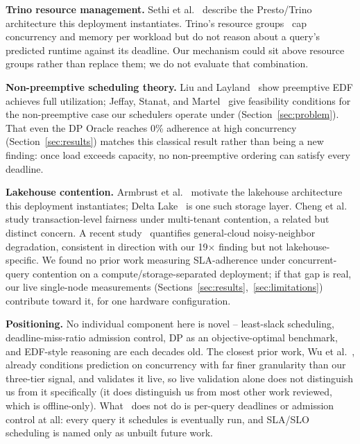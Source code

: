 \documentclass[conference]{IEEEtran}
\begin{document}
\textbf{Trino resource management.} Sethi et al.~\cite{sethi2019presto} describe the Presto/Trino architecture this deployment instantiates. Trino's resource groups~\cite{trino2026resourcegroups} cap concurrency and memory per workload but do not reason about a query's predicted runtime against its deadline. Our mechanism could sit above resource groups rather than replace them; we do not evaluate that combination.

\textbf{Non-preemptive scheduling theory.} Liu and Layland~\cite{liu1973scheduling} show preemptive EDF achieves full utilization; Jeffay, Stanat, and Martel~\cite{jeffay1991nonpreemptive} give feasibility conditions for the non-preemptive case our schedulers operate under (Section~\ref{sec:problem}). That even the DP Oracle reaches 0\% adherence at high concurrency (Section~\ref{sec:results}) matches this classical result rather than being a new finding: once load exceeds capacity, no non-preemptive ordering can satisfy every deadline.

\textbf{Lakehouse contention.} Armbrust et al.~\cite{armbrust2021lakehouse} motivate the lakehouse architecture this deployment instantiates; Delta Lake~\cite{armbrust2020deltalake} is one such storage layer. Cheng et al.~\cite{cheng2025fair} study transaction-level fairness under multi-tenant contention, a related but distinct concern. A recent study~\cite{schiavo2026noisyneighbor} quantifies general-cloud noisy-neighbor degradation, consistent in direction with our 19$\times$ finding but not lakehouse-specific. We found no prior work measuring SLA-adherence under concurrent-query contention on a compute/storage-separated deployment; if that gap is real, our live single-node measurements (Sections~\ref{sec:results},~\ref{sec:limitations}) contribute toward it, for one hardware configuration.

\textbf{Positioning.} No individual component here is novel -- least-slack scheduling, deadline-miss-ratio admission control, DP as an objective-optimal benchmark, and EDF-style reasoning are each decades old. The closest prior work, Wu et al.~\cite{wu2025iconqsched}, already conditions prediction on concurrency with far finer granularity than our three-tier signal, and validates it live, so live validation alone does not distinguish us from it specifically (it does distinguish us from most other work reviewed, which is offline-only). What~\cite{wu2025iconqsched} does not do is per-query deadlines or admission control at all: every query it schedules is eventually run, and SLA/SLO scheduling is named only as unbuilt future work.
\end{document}
